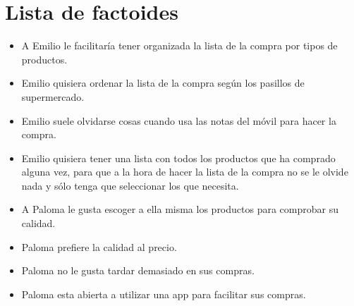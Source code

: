 \chapter{Lista de factoides}
\begin{itemize}
    \item A Emilio le facilitaría tener organizada la lista de la compra por tipos de productos.
    \item Emilio quisiera ordenar la lista de la compra según los pasillos de supermercado.
    \item Emilio suele olvidarse cosas cuando usa las notas del móvil para hacer la compra.
    \item Emilio quisiera tener una lista con todos los productos que ha comprado alguna vez, para que a la hora de hacer la lista de la compra no se le olvide nada y sólo tenga que seleccionar los que necesita.
    
    \item A Paloma le gusta escoger a ella misma los productos para comprobar su calidad.
    \item Paloma prefiere la calidad al precio.
    \item Paloma no le gusta tardar demasiado en sus compras.
    \item Paloma esta abierta a utilizar una app para facilitar sus compras.
\end{itemize}